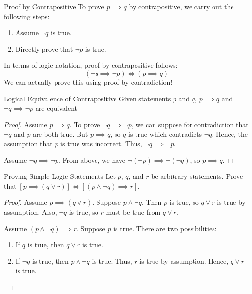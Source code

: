 \begin{tecbox}{Proof by Contrapositive}{}
    To prove $p \implies q$ by contrapositive, we carry out the following steps:
    \begin{enumerate}
        \item Assume $\neg q$ is true.
        \item Directly prove that $\neg p$ is true.
    \end{enumerate}
\end{tecbox}

In terms of logic notation, proof by contrapositive follows:
\[ (\neg q \implies \neg p) \iff (p \implies q) \]
We can actually prove this using proof by contradiction!
\begin{exbox}{Logical Equivalence of Contrapositive}{}
    Given statements $p$ and $q$, $p \implies q$ and $\neg q \implies \neg p$ are equivalent.
    \tcblower
    \begin{proof}
        Assume $p \implies q$. To prove $\neg q \implies \neg p$, we can suppose for contradiction that $\neg q$ and $p$ are both true. But $p \implies q$, so $q$ is true which contradicts $\neg q$. Hence, the assumption that $p$ is true was incorrect. Thus, $\neg q \implies \neg p$.

        Assume $\neg q \implies \neg p$. From above, we have $\neg ( \neg p ) \implies \neg (\neg q)$, so $p \implies q$.
    \end{proof}
\end{exbox}

\begin{exbox}{Proving Simple Logic Statements}{}
    Let $p$, $q$, and $r$ be arbitrary statements. Prove that $\left[ p \implies (q \lor r) \right] \iff \left[ (p \land \neg q) \implies r \right]$.
    \tcblower
    \begin{proof}
        Assume $p \implies (q \lor r)$. Suppose $p \land \neg q$. Then $p$ is true, so $q \lor r$ is true by assumption. Also, $\neg q$ is true, so $r$ must be true from $q \lor r$.

        Assume $(p \land \neg q) \implies r$. Suppose $p$ is true. There are two possibilities:
        \begin{enumerate}
            \item If $q$ is true, then $q \lor r$ is true.
            \item If $\neg q$ is true, then $p \land \neg q$ is true. Thus, $r$ is true by assumption. Hence, $q \lor r$ is true.
        \end{enumerate}
    \end{proof}
\end{exbox}

